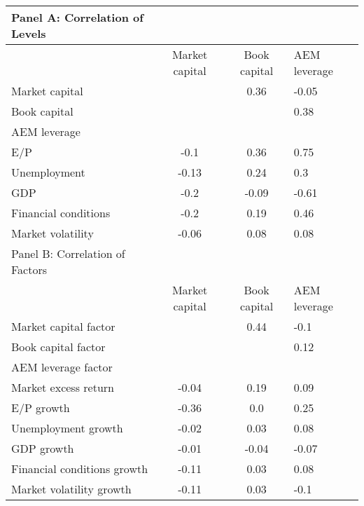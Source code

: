 \documentclass{article}
\begin{document}
    \begin{table}[htbp]
    \centering
    \begin{adjustbox}{max width=\textwidth}
    \small
    \begin{tabular}{lcc}
        \toprule
        Panel A: Correlation of Levels \\
        \midrule
         & Market capital & Book capital & AEM leverage \\
        \midrule
        Market capital &  & 0.36 & -0.05 \\
Book capital &  &  & 0.38 \\
AEM leverage &  &  &  \\
E/P & -0.1 & 0.36 & 0.75 \\
Unemployment & -0.13 & 0.24 & 0.3 \\
GDP & -0.2 & -0.09 & -0.61 \\
Financial conditions & -0.2 & 0.19 & 0.46 \\
Market volatility & -0.06 & 0.08 & 0.08 \\
        \midrule
        Panel B: Correlation of Factors \\
        \midrule
         & Market capital & Book capital & AEM leverage \\
        \midrule
        Market capital factor &  & 0.44 & -0.1 \\
Book capital factor &  &  & 0.12 \\
AEM leverage factor &  &  &  \\
Market excess return & -0.04 & 0.19 & 0.09 \\
E/P growth & -0.36 & 0.0 & 0.25 \\
Unemployment growth & -0.02 & 0.03 & 0.08 \\
GDP growth & -0.01 & -0.04 & -0.07 \\
Financial conditions growth & -0.11 & 0.03 & 0.08 \\
Market volatility growth & -0.11 & 0.03 & -0.1 \\
        \bottomrule
    \end{tabular}
    \end{adjustbox}
    \end{table}
    
\end{document}

